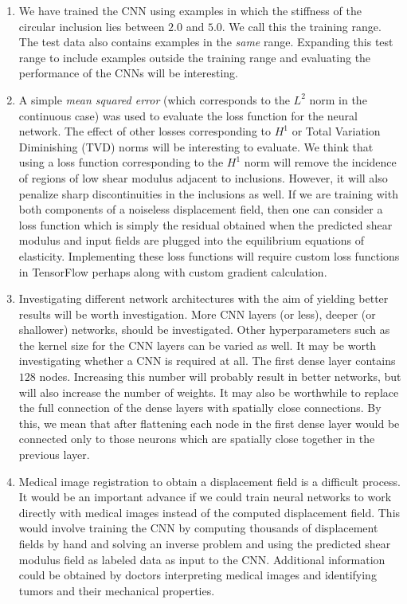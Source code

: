 \documentclass[12pt]{article}
\begin{document}
\begin{enumerate}
\item{We have trained the CNN using examples in which the stiffness of the circular inclusion lies between $2.0$ and $5.0$. We call this the training range. The test data also contains examples in the \textit{same} range. Expanding this test range to include examples outside the training range and evaluating the performance of the CNNs will be interesting.}
\item{A simple \textit{mean squared error} (which corresponds to the $L^2$ norm in the continuous case) was used to evaluate the loss function for the neural network. The effect of other losses corresponding to $H^1$ or Total Variation Diminishing (TVD) norms will be interesting to evaluate. We think that using a loss function corresponding to the $H^1$ norm will remove the incidence of regions of low shear modulus adjacent to inclusions. However, it will also penalize sharp discontinuities in the inclusions as well. If we are training with both components of a noiseless displacement field, then one can consider a loss function which is simply the residual obtained when the predicted shear modulus and input fields are plugged into the equilibrium equations of elasticity. Implementing these loss functions will require custom loss functions in TensorFlow perhaps along with custom gradient calculation.}
\item{Investigating different network architectures with the aim of yielding better results will be worth investigation. More CNN layers (or less), deeper (or shallower) networks, should be investigated. Other hyperparameters such as the kernel size for the CNN layers can be varied as well. It may be worth investigating whether a CNN is required at all. The first dense layer contains $128$ nodes. Increasing this number will probably result in better networks, but will also increase the number of weights. It may also be worthwhile to replace the full connection of the dense layers with spatially close connections. By this, we mean that after flattening each node in the first dense layer would be connected only to those neurons which are spatially close together in the previous layer.}
\item{Medical image registration to obtain a displacement field is a difficult process. It would be an important advance if we could train neural networks to work directly with medical images instead of the computed displacement field. This would involve training the CNN by computing thousands of displacement fields by hand and solving an inverse problem and using the predicted shear modulus field as labeled data as input to the CNN. Additional information could be obtained by doctors interpreting medical images and identifying tumors and their mechanical properties.}

\end{enumerate}
\end{document}
